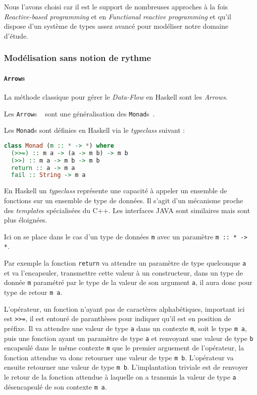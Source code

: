 \documentclass{llncs}
\newcommand{\DF}{\emph{Data-Flow} }
\newcommand{\RP}{\emph{Reactive-based programming} }
\newcommand{\FRP}{\emph{Functional reactive programming} }
\newcommand{\Arrs}{\texttt{Arrow}s }
\begin{document}
Nous l'avons choisi car il est le support de nombreuses approches à la fois \RP
et en \FRP et qu'il dispose d'un système de types assez avancé pour modéliser
notre domaine d'étude.

\subsubsection{Modélisation sans notion de rythme}
\paragraph{\Arrs}
La méthode classique pour gérer le \DF en Haskell sont les \emph{Arrows}.

Les \Arrs~\cite{Hughes00} sont une généralisation des \texttt{Monad}s~\cite{Wadler90}.

Les \texttt{Monad}s sont définies en Haskell via le \emph{typeclass} suivant :
\begin{lstlisting}[language=haskell]
class Monad (m :: * -> *) where
  (>>=) :: m a -> (a -> m b) -> m b
  (>>) :: m a -> m b -> m b
  return :: a -> m a
  fail :: String -> m a
\end{lstlisting}

En Haskell un \emph{typeclass} représente une capacité à appeler un ensemble
de fonctions sur un ensemble de type de données.
Il s'agit d'un mécanisme proche des \emph{template}s spécialisées du C++.
Les interfaces JAVA sont similaires mais sont plus éloignées.

Ici on se place dans le cas d'un type de données \texttt{m} avec un paramètre
\texttt{m :: * -> *}.

Par exemple la fonction \texttt{return} va attendre un paramètre de type quelconque
\texttt{a} et va l'encapsuler, transmettre cette valeur à un constructeur, dans
un type de donnée \texttt{m} paramétré par le type de la valeur de son argument
\texttt{a}, il aura donc pour type de retour \texttt{m a}.

L'opérateur, un fonction n'ayant pas de caractères alphabétiques, important ici
est \texttt{>>=}, il est entouré de paranthèses pour indiquer qu'il est en
position de préfixe.
Il va attendre une valeur de type \texttt{a} dans un contexte \texttt{m}, soit
le type \texttt{m a}, puis une fonction ayant un paramètre de type \texttt{a}
et renvoyant une valeur de type \texttt{b} encapsulé dans le même contexte \texttt{m}
que le premier arguement de l'opérateur, la fonction attendue va donc retourner
une valeur de type \texttt{m b}. L'opérateur va ensuite retourner une valeur de
type \texttt{m b}.
L'implantation triviale est de renvoyer le retour de la fonction attendue à
laquelle on a transmis la valeur de type \texttt{a} désencapsulé de son contexte
\texttt{m a}.
\end{document}
